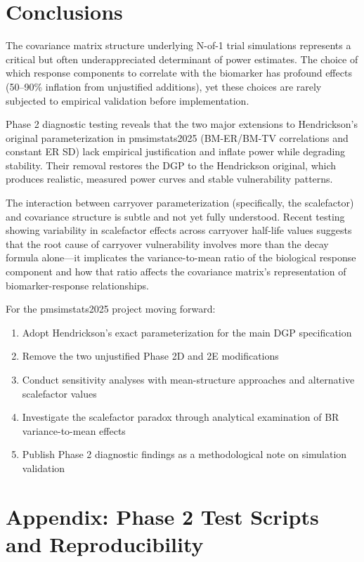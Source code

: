 \documentclass[12pt,a4paper]{article}
\begin{document}
\section{Conclusions}

The covariance matrix structure underlying N-of-1 trial simulations represents a critical but often underappreciated determinant of power estimates. The choice of which response components to correlate with the biomarker has profound effects (50--90\% inflation from unjustified additions), yet these choices are rarely subjected to empirical validation before implementation.

Phase 2 diagnostic testing reveals that the two major extensions to Hendrickson's original parameterization in pmsimstats2025 (BM-ER/BM-TV correlations and constant ER SD) lack empirical justification and inflate power while degrading stability. Their removal restores the DGP to the Hendrickson original, which produces realistic, measured power curves and stable vulnerability patterns.

The interaction between carryover parameterization (specifically, the scalefactor) and covariance structure is subtle and not yet fully understood. Recent testing showing variability in scalefactor effects across carryover half-life values suggests that the root cause of carryover vulnerability involves more than the decay formula alone---it implicates the variance-to-mean ratio of the biological response component and how that ratio affects the covariance matrix's representation of biomarker-response relationships.

For the pmsimstats2025 project moving forward:

\begin{enumerate}
\item Adopt Hendrickson's exact parameterization for the main DGP specification
\item Remove the two unjustified Phase 2D and 2E modifications
\item Conduct sensitivity analyses with mean-structure approaches and alternative scalefactor values
\item Investigate the scalefactor paradox through analytical examination of BR variance-to-mean effects
\item Publish Phase 2 diagnostic findings as a methodological note on simulation validation
\end{enumerate}

\appendix

\section{Appendix: Phase 2 Test Scripts and Reproducibility}
\end{document}
